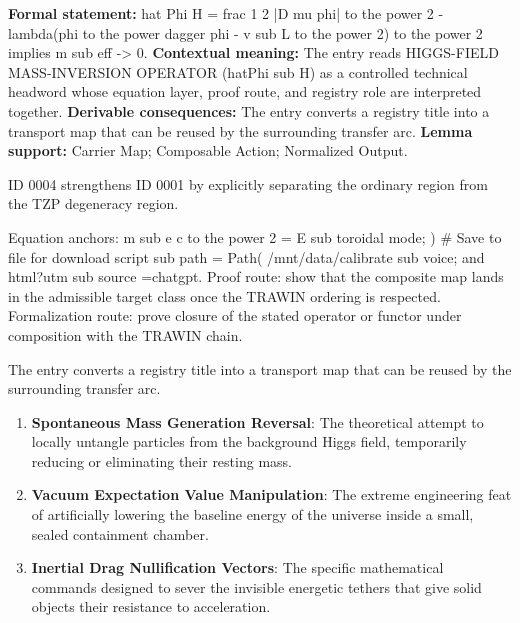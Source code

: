 \begingroup\footnotesize\setlength{\emergencystretch}{3em}\sloppy
\textbf{Formal statement:} hat Phi H = frac 1 2 |D mu phi| to the power 2 - lambda(phi to the power dagger phi - v sub L to the power 2) to the power 2 implies m sub eff -> 0. \textbf{Contextual meaning:} The entry reads HIGGS-FIELD MASS-INVERSION OPERATOR (hatPhi sub H) as a controlled technical headword whose equation layer, proof route, and registry role are interpreted together. \textbf{Derivable consequences:} The entry converts a registry title into a transport map that can be reused by the surrounding transfer arc. \textbf{Lemma support:} Carrier Map; Composable Action; Normalized Output.\par
\endgroup

ID 0004 strengthens ID 0001 by explicitly separating the ordinary region from the TZP degeneracy region.

Equation anchors: m sub e c to the power 2 = E sub toroidal mode; ) \# Save to file for download script sub path = Path( /mnt/data/calibrate sub voice; and html?utm sub source =chatgpt. Proof route: show that the composite map lands in the admissible target class once the TRAWIN ordering is respected. Formalization route: prove closure of the stated operator or functor under composition with the TRAWIN chain.

The entry converts a registry title into a transport map that can be reused by the surrounding transfer arc.
\endgroup

\begin{enumerate}[leftmargin=1.6em,itemsep=6pt,topsep=4pt]
\item \textbf{Spontaneous Mass Generation Reversal}: The theoretical attempt to locally untangle particles from the background Higgs field, temporarily reducing or eliminating their resting mass.
\item \textbf{Vacuum Expectation Value Manipulation}: The extreme engineering feat of artificially lowering the baseline energy of the universe inside a small, sealed containment chamber.
\item \textbf{Inertial Drag Nullification Vectors}: The specific mathematical commands designed to sever the invisible energetic tethers that give solid objects their resistance to acceleration.
\end{enumerate}

